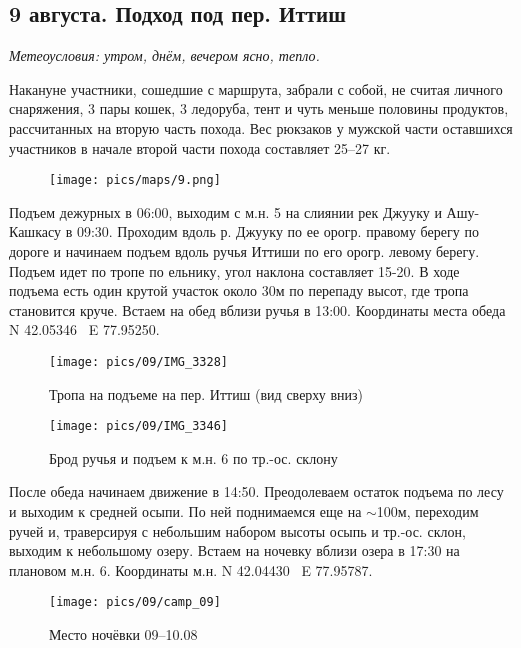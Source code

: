 \subsection{9 августа. Подход под пер. Иттиш}
\textit{Метеоусловия: утром, днём, вечером ясно, тепло.}

Накануне участники, сошедшие с маршрута, забрали с собой, не считая личного снаряжения, 3 пары кошек, 3 ледоруба, тент и чуть меньше половины продуктов, рассчитанных на вторую часть похода. Вес рюкзаков у мужской части оставшихся участников в начале второй части похода составляет 25--27 кг.

\begin{figure}[h!]
	\centering
	\texttt{[image: pics/maps/9.png]}
	\label{fig:mini_9}
\end{figure}

Подъем дежурных в 06:00, выходим с м.н. 5 на слиянии рек Джууку и Ашу-Кашкасу в 09:30. Проходим вдоль р. Джууку по ее орогр. правому берегу  по дороге и начинаем подъем вдоль ручья Иттиши по его орогр. левому берегу. Подъем идет по тропе по ельнику, угол наклона составляет 15-20\degree. В ходе подъема есть один крутой участок около 30м по перепаду высот, где тропа становится круче. Встаем на обед вблизи ручья в 13:00. Координаты места обеда N 42.05346\degree~ E 77.95250\degree.

\begin{figure}[h!]
	\centering
	\texttt{[image: pics/09/IMG\_3328]}
	\caption{Тропа на подъеме на пер. Иттиш (вид сверху вниз)}
	\label{fig:IMG_3328}
\end{figure}

\begin{figure}[h!]
	\centering
	\texttt{[image: pics/09/IMG\_3346]}
	\caption{Брод ручья и подъем к м.н. 6 по тр.-ос. склону}
	\label{fig:IMG_3346}
\end{figure}


После обеда начинаем движение в 14:50. Преодолеваем остаток подъема по лесу и выходим к средней осыпи. По ней поднимаемся еще на $\sim$100м, переходим ручей и, траверсируя с небольшим набором высоты осыпь и тр.-ос. склон, выходим к небольшому озеру. Встаем на ночевку вблизи озера в 17:30 на плановом м.н. 6. Координаты м.н. N 42.04430\degree~ E 77.95787\degree.


\begin{figure}[h!]
	\centering
	\texttt{[image: pics/09/camp\_09]} %
	\caption{Место ночёвки 09--10.08}
	\label{fig:camp_09}
\end{figure}

\clearpage